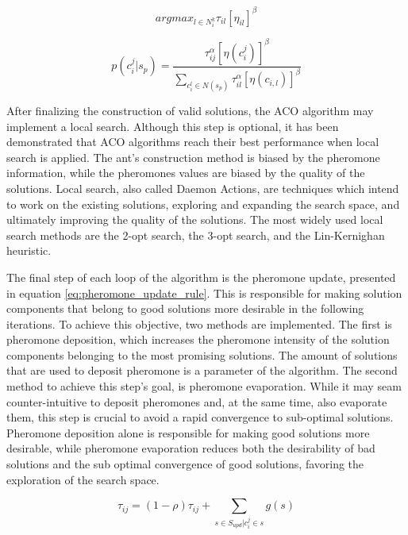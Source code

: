 \begin{equation} \label{eq:heuristic_rule}
	arg max_{l \in N_{i}^{k} } \tau_{il}[\eta_{il}]^{\beta}
\end{equation}


\begin{equation} \label{eq:ant_system_rule}
	p(c_{i}^{j}|s_{p}) = \frac{\tau_{ij}^{\alpha}  [\eta(c_{i}^{j})]^{\beta}}{\sum_{c_{i}^{l} \in N(s_{p})} \tau_{il}^{\alpha} [\eta(c_{i,l})]^{\beta}}
\end{equation}


After finalizing the construction of valid solutions, the ACO algorithm may implement a local search. Although this step is optional, it has been demonstrated that ACO algorithms reach their best performance when local search is applied. The ant's construction method is biased by the pheromone information, while the pheromones values are biased by the quality of the solutions. Local search, also called Daemon Actions, are techniques which intend to work on the existing solutions, exploring and expanding the search space, and ultimately improving the quality of the solutions. The most widely used local search methods are the 2-opt search, the 3-opt search, and the Lin-Kernighan heuristic.

The final step of each loop of the algorithm is the pheromone update, presented in equation \ref{eq:pheromone_update_rule}. This is responsible for making solution components that belong to good solutions more desirable in the following iterations. To achieve this objective, two methods are implemented. The first is pheromone deposition, which increases the pheromone intensity of the solution components belonging to the most promising solutions. The amount of solutions that are used to deposit pheromone is a parameter of the algorithm. The second method to achieve this step's goal, is pheromone evaporation. While it may seam counter-intuitive to deposit pheromones and, at the same time, also evaporate them, this step is crucial to avoid a rapid convergence to sub-optimal solutions. Pheromone deposition alone is responsible for making good solutions more desirable, while pheromone evaporation reduces both the desirability of bad solutions and the sub optimal convergence of good solutions, favoring the exploration of the search space. 

\begin{equation} \label{eq:pheromone_update_rule}
		\tau_{ij} = (1-\rho)\tau_{ij} + \sum_{s\in S_{upd}|c_{i}^{j}\in s}g(s)
\end{equation}